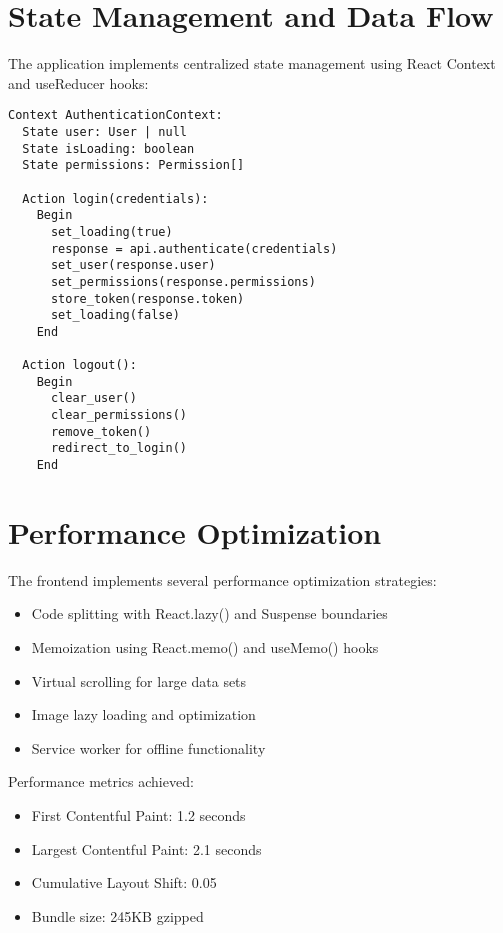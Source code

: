 \documentclass[a4paper,12pt,oneside]{book}
\begin{document}
\section{State Management and Data Flow}

The application implements centralized state management using React Context and useReducer hooks:

\begin{lstlisting}[language=Pseudocode, caption=State Management Implementation]
Context AuthenticationContext:
  State user: User | null
  State isLoading: boolean
  State permissions: Permission[]
  
  Action login(credentials):
    Begin
      set_loading(true)
      response = api.authenticate(credentials)
      set_user(response.user)
      set_permissions(response.permissions)
      store_token(response.token)
      set_loading(false)
    End
  
  Action logout():
    Begin
      clear_user()
      clear_permissions()
      remove_token()
      redirect_to_login()
    End
\end{lstlisting}

\section{Performance Optimization}

The frontend implements several performance optimization strategies:

\begin{itemize}
    \item Code splitting with React.lazy() and Suspense boundaries
    \item Memoization using React.memo() and useMemo() hooks
    \item Virtual scrolling for large data sets
    \item Image lazy loading and optimization
    \item Service worker for offline functionality
\end{itemize}

Performance metrics achieved:
\begin{itemize}
    \item First Contentful Paint: 1.2 seconds
    \item Largest Contentful Paint: 2.1 seconds
    \item Cumulative Layout Shift: 0.05
    \item Bundle size: 245KB gzipped
\end{itemize}
\end{document}

